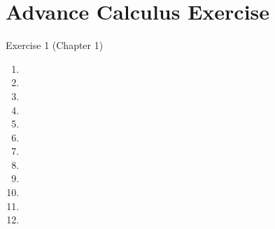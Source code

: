 


\cfoot{\thepage} %

\section*{Advance Calculus Exercise}
\center Exercise 1 (Chapter 1)
 
 \begin{enumerate}[wide,label = $\arabic* .$]
 
 	\item 
 	\item 
 	\item 
 	\item 
 	\item 
 	\item 
 	\item 
 	\item 
 	\item 
 	\item 
 	\item 
 	\item 
   
 \end{enumerate}

